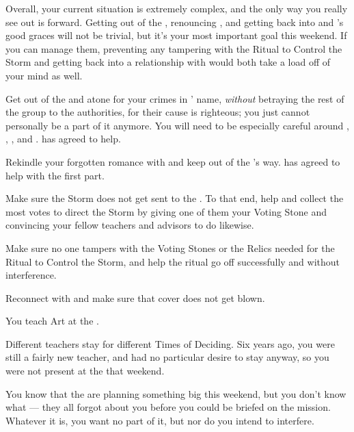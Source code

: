 \documentclass[char]{GL2020}
\begin{document}
Overall, your current situation is extremely complex, and the only way you really see out is forward. Getting out of the \pGoaties{}, renouncing \cGenesis{}, and getting back into \cEbb{} and \cFlow{}'s good graces will not be trivial, but it's your most important goal this weekend. If you can manage them, preventing any tampering with the Ritual to Control the Storm and getting back into a relationship with \cHeadScientist{} would both take a load off of your mind as well.

\begin{itemz}
    \item Get out of the \pGoaties{} and atone for your crimes in \cGenesis{}' name, \emph{without} betraying the rest of the group to the authorities, for their cause is righteous; you just cannot personally be a part of it anymore. You will need to be especially careful around \cChupLeader{}, \cChupSecond{}, \cChupInventor{}, and \cChupStudent{}. \cLibrarian{} has agreed to help.
    \item Rekindle your forgotten romance with \cHeadScientist{} and keep \cHeadScientist{\them} out of the \pGoaties{}'s way. \cInitiate{} has agreed to help with the first part.
    \item Make sure the Storm does not get sent to the \pShip{}. To that end, help \cInitiate{} and \cPirateChild{} collect the most votes to direct the Storm by giving one of them your Voting Stone and convincing your fellow teachers and advisors to do likewise.
\end{itemz}

\begin{itemz}
    \item Make sure no one tampers with the Voting Stones or the Relics needed for the Ritual to Control the Storm, and help the ritual go off successfully and without interference.
    \item Reconnect with \cAssistantScientist{} and make sure that \cAssistantScientist{\their} cover does not get blown. 
\end{itemz}

\begin{itemz}[Notes]
    \item You teach Art at the \pSchool{}.
    \item Different teachers stay for different Times of Deciding. Six years ago, you were still a fairly new teacher, and had no particular desire to stay anyway, so you were not present at the \pSc{} that weekend.
    \item You know that the \pGoaties{} are planning something big this weekend, but you don't know what — they all forgot about you before you could be briefed on the mission. Whatever it is, you want no part of it, but nor do you intend to interfere.
\end{itemz}
\end{document}
